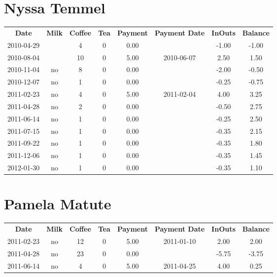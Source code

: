 \section{Nyssa Temmel}

\begin{center}
\begin{tabular}{cccccccc}
\textbf{Date} & \textbf{Milk} & \textbf{Coffee} & \textbf{Tea} & \textbf{Payment} & \textbf{Payment Date} & \textbf{InOuts} & \textbf{Balance} \\
2010-04-29 &  &  4 & 0 & 0.00 &  & -1.00 & -1.00\\ 
2010-08-04 &  & 10 & 0 & 5.00 & 2010-06-07 &  2.50 &  1.50\\ 
2010-11-04 & no &  8 & 0 & 0.00 &  & -2.00 & -0.50\\ 
2010-12-07 & no &  1 & 0 & 0.00 &  & -0.25 & -0.75\\ 
2011-02-23 & no &  4 & 0 & 5.00 & 2011-02-04 &  4.00 &  3.25\\ 
2011-04-28 & no &  2 & 0 & 0.00 &  & -0.50 &  2.75\\ 
2011-06-14 & no &  1 & 0 & 0.00 &  & -0.25 &  2.50\\ 
2011-07-15 & no &  1 & 0 & 0.00 &  & -0.35 &  2.15\\ 
2011-09-22 & no &  1 & 0 & 0.00 &  & -0.35 &  1.80\\ 
2011-12-06 & no &  1 & 0 & 0.00 &  & -0.35 &  1.45\\ 
2012-01-30 & no &  1 & 0 & 0.00 &  & -0.35 &  1.10
\end{tabular}
\end{center}

\section{Pamela Matute}

\begin{center}
\begin{tabular}{cccccccc}
\textbf{Date} & \textbf{Milk} & \textbf{Coffee} & \textbf{Tea} & \textbf{Payment} & \textbf{Payment Date} & \textbf{InOuts} & \textbf{Balance} \\
2011-02-23 & no & 12 & 0 & 5.00 & 2011-01-10 &  2.00 &  2.00\\ 
2011-04-28 & no & 23 & 0 & 0.00 &  & -5.75 & -3.75\\ 
2011-06-14 & no &  4 & 0 & 5.00 & 2011-04-25 &  4.00 &  0.25
\end{tabular}
\end{center}

